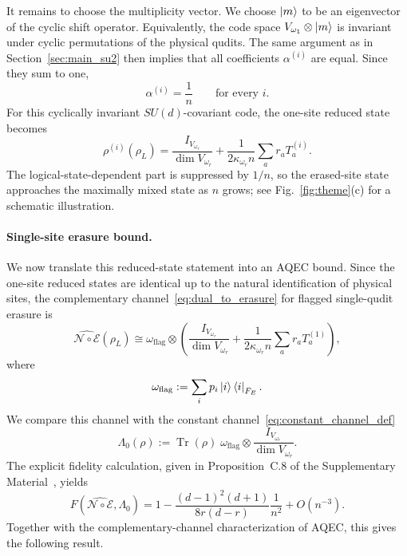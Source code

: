 \documentclass[10pt,twocolumn,superscriptaddress,aps,amsmath,amssymb,citeautoscript,floatfix,prx,longbibliography]{revtex4-2}
\theoremstyle{plain}
\theoremstyle{plain}
\theoremstyle{plain}
\theoremstyle{plain}
\theoremstyle{plain}
\theoremstyle{plain}
\begin{document}
It remains to choose the multiplicity vector. We choose $\ket m$ to be an eigenvector of the cyclic shift operator. Equivalently, the code space $V_{\omega_1}\otimes\ket m$ is invariant under cyclic permutations of the physical qudits. The same argument as in Section~\ref{sec:main_su2} then implies that all coefficients $\alpha^{(i)}$ are equal. Since they sum to one,
$$
\alpha^{(i)}=\frac1n
\qquad
\text{for every } i .
$$
For this cyclically invariant $SU(d)$-covariant code, the one-site reduced state becomes
$$
\rho^{(i)}(\rho_L)
=
\frac{I_{V_{\omega_r}}}{\dim V_{\omega_r}}
+
\frac{1}{2\kappa_{\omega_r}n}
\sum_a r_a T_a^{(i)} .
$$
The logical-state-dependent part is suppressed by $1/n$, so the erased-site state approaches the maximally mixed state as $n$ grows; see Fig.~\ref{fig:theme}(c) for a schematic illustration.

\paragraph{Single-site erasure bound.}

We now translate this reduced-state statement into an AQEC bound. Since the one-site reduced states are identical up to the natural identification of physical sites, the complementary channel~\eqref{eq:dual_to_erasure} for flagged single-qudit erasure is
$$
\widehat{\mathcal N\circ\mathcal E}(\rho_L)
\cong
\omega_{\mathrm{flag}}
\otimes
\left(
\frac{I_{V_{\omega_r}}}{\dim V_{\omega_r}}
+
\frac{1}{2\kappa_{\omega_r}n}
\sum_a r_a T_a^{(1)}
\right),
$$
where
$$
\omega_{\mathrm{flag}}
:=
\sum_i p_i\ket i\bra i_{F_E}.
$$
We compare this channel with the constant channel~\eqref{eq:constant_channel_def}
$$
\Lambda_0(\rho)
:=
\operatorname{Tr}(\rho)\;
\omega_{\mathrm{flag}}
\otimes
\frac{I_{V_{\omega_r}}}{\dim V_{\omega_r}} .
$$
The explicit fidelity calculation, given in Proposition~C.8 of the Supplementary Material~\cite{SuppMat}, yields
\begin{equation}\label{eq:fidelity_sud}
F\left(\widehat{\mathcal N\circ\mathcal E},\Lambda_0\right)
=
1
-
\frac{(d-1)^2(d+1)}{8r(d-r)}
\frac{1}{n^2}
+
O(n^{-3}) .
\end{equation}
Together with the complementary-channel characterization of AQEC, this gives the following result.
\end{document}
